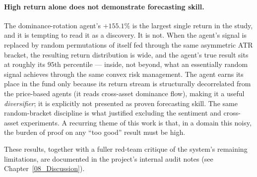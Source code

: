 \paragraph{High return alone does not demonstrate forecasting skill.}
The dominance-rotation agent's $+155.1\%$ is the largest single return in the study, and it is tempting to read it as a discovery. It is not. When the agent's signal is replaced by random permutations of itself fed through the same asymmetric ATR bracket, the resulting return distribution is wide, and the agent's true result sits at roughly its $95$th percentile --- inside, not beyond, what an essentially random signal achieves through the same convex risk management. The agent earns its place in the fund only because its return stream is structurally decorrelated from the price-based agents (it reads cross-asset dominance flow), making it a useful \textit{diversifier}; it is explicitly not presented as proven forecasting skill. The same random-bracket discipline is what justified excluding the sentiment and cross-asset experiments. A recurring theme of this work is that, in a domain this noisy, the burden of proof on any ``too good'' result must be high.


These results, together with a fuller red-team critique of the system's remaining limitations, are documented in the project's internal audit notes (see Chapter~\ref{08_Discussion}).
